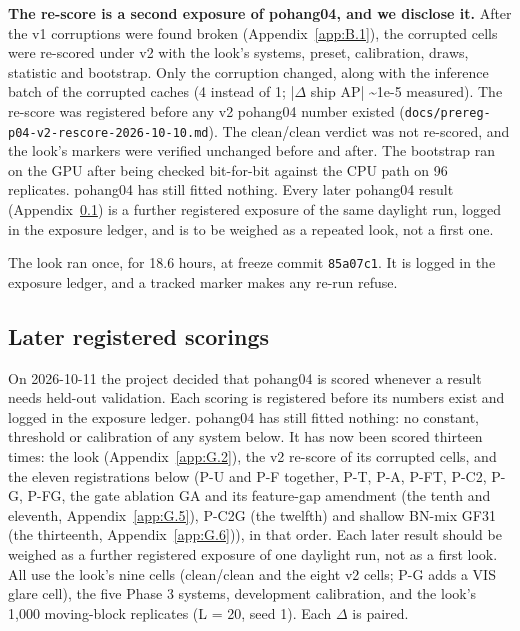 \documentclass[10pt]{article}
\begin{document}
\textbf{The re-score is a second exposure of pohang04, and we disclose it.} After the v1 corruptions were found broken (Appendix~\ref{app:B.1}), the corrupted cells were re-scored under v2 with the look's systems, preset, calibration, draws, statistic and bootstrap. Only the corruption changed, along with the inference batch of the corrupted caches (4 instead of 1; |$\Delta$ ship AP| \textasciitilde{}1e-5 measured). The re-score was registered before any v2 pohang04 number existed (\texttt{docs/\allowbreak{}prereg-p04-v2-rescore-2026-10-10.md}). The clean/clean verdict was not re-scored, and the look's markers were verified unchanged before and after. The bootstrap ran on the GPU after being checked bit-for-bit against the CPU path on 96 replicates. pohang04 has still fitted nothing. Every later pohang04 result (Appendix~\ref{app:G.3}) is a further registered exposure of the same daylight run, logged in the exposure ledger, and is to be weighed as a repeated look, not a first one.

The look ran once, for 18.6 hours, at freeze commit \texttt{85a07c1}. It is logged in the exposure ledger, and a tracked marker makes any re-run refuse.

\subsection{Later registered scorings}\label{app:G.3}
On 2026-10-11 the project decided that pohang04 is scored whenever a result needs held-out validation. Each scoring is registered before its numbers exist and logged in the exposure ledger. pohang04 has still fitted nothing: no constant, threshold or calibration of any system below. It has now been scored thirteen times: the look (Appendix~\ref{app:G.2}), the v2 re-score of its corrupted cells, and the eleven registrations below (P-U and P-F together, P-T, P-A, P-FT, P-C2, P-G, P-FG, the gate ablation GA and its feature-gap amendment (the tenth and eleventh, Appendix~\ref{app:G.5}), P-C2G (the twelfth) and shallow BN-mix GF31 (the thirteenth, Appendix~\ref{app:G.6})), in that order. Each later result should be weighed as a further registered exposure of one daylight run, not as a first look. All use the look's nine cells (clean/clean and the eight v2 cells; P-G adds a VIS glare cell), the five Phase 3 systems, development calibration, and the look's 1,000 moving-block replicates (L = 20, seed 1). Each $\Delta$ is paired.
\end{document}

